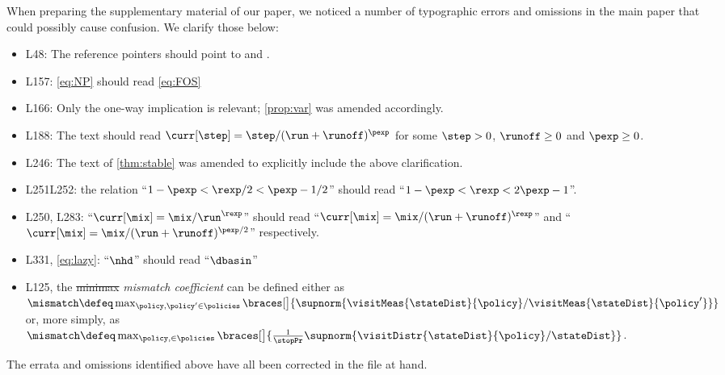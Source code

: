

When preparing the supplementary material of our paper, we noticed a number of typographic errors and omissions in the main paper that could possibly cause confusion.
We clarify those below:
\begin{itemize}
\item
L48:
The reference pointers should point to \citet{Per13} and \citet{LPX20}.
\item
L157:
\eqref{eq:NP} should read \eqref{eq:FOS}
\item
L166:
Only the one-way implication is relevant;
\cref{prop:var} was amended accordingly.
\item
L188:
The text should read $\curr[\step] = \step/(\run + \runoff)^{\pexp}$ for some $\step>0$, $\runoff\geq0$ and $\pexp\geq0$.
\item
L246:
The text of \cref{thm:stable} was amended to explicitly include the above clarification.
\item
L251\textendash L252:
the relation ``$1-\pexp<\rexp/2<\pexp-1/2$'' should read ``$1-\pexp < \rexp < 2\pexp-1$''.
\item L250, L283:
``$\curr[\mix] = \mix/\run^{\rexp}$'' should read  ``$\curr[\mix] = \mix/(\run+\runoff)^{\rexp}$'' and ``$\curr[\mix] = \mix/(\run+\runoff)^{\pexp/2}$'' respectively.
\item
L331, \cref{eq:lazy}:
``$\nhd$'' should read ``$\dbasin$''
\item L125, the \st{minimax} \emph{mismatch coefficient} can be defined either as $\mismatch\defeq\max_{\policy,\policy'\in\policies}\braces[\big]{\supnorm{\visitMeas{\stateDist}{\policy}/\visitMeas{\stateDist}{\policy'}} }$ or, more simply, as $\mismatch\defeq\max_{\policy,\in\policies}\braces[\big]{\tfrac{1}{\stopPr}\supnorm{\visitDistr{\stateDist}{\policy}/\stateDist} }$.

\end{itemize}
The errata and omissions identified above have all been corrected in the file at hand.